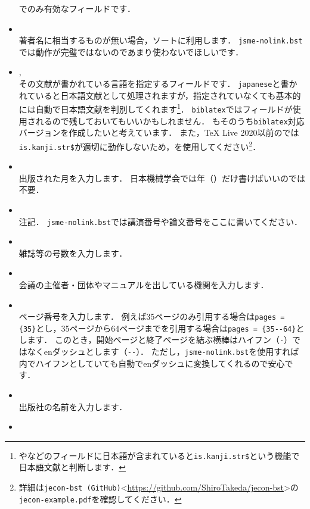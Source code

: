 \documentclass[a4paper,fleqn,uplatex,dvipdfmx]{jsarticle}
\newcommand{\jsmefile}{\texttt{jsme-nolink.bst}}
\begin{document}
\begin{itemize}
        \ttarticle でのみ有効なフィールドです．
    \item \ttkey \\
        著者名に相当するものが無い場合，ソートに利用します．
        \jsmefile では動作が完璧ではないのであまり使わないでほしいです．
    \item \ttlangid, \ttlanguage \\
        その文献が書かれている言語を指定するフィールドです．
        \verb|japanese|と書かれていると日本語文献として処理されますが，指定されていなくても基本的には自動で日本語文献を判別してくれます\footnote{\ttauthor や\tttitle などのフィールドに日本語が含まれていると\texttt{is.kanji.str\$}という機能で日本語文献と判断します．}．
        \verb|biblatex|では\ttlangid フィールドが使用されるので残しておいてもいいかもしれません．
        \JSMErepos もそのうち\verb|biblatex|対応バージョンを作成したいと考えています．
        また，TeX Live 2020以前の\upBibTeX{}では\verb|is.kanji.str$|が適切に動作しないため，\ttlangid を使用してください\footnote{詳細は\verb|jecon-bst (GitHub)|\textless \url{https://github.com/ShiroTakeda/jecon-bst}\textgreater の\verb|jecon-example.pdf|を確認してください．}．
    \item \ttmonth \\
        出版された月を入力します．
        日本機械学会では年（\ttyear）だけ書けばいいので\ttmonth は不要．
    \item \ttnote \\
        注記．
        \jsmefile では講演番号や論文番号をここに書いてください．
    \item \ttnumber \\
        雑誌等の号数を入力します．
    \item \ttorganization \\
        会議の主催者・団体やマニュアルを出している機関を入力します．
    \item \ttpages \\
        ページ番号を入力します．
        例えば35ページのみ引用する場合は\verb|pages = {35}|とし，35ページから64ページまでを引用する場合は\verb|pages = {35--64}|とします．
        このとき，開始ページと終了ページを結ぶ横棒はハイフン（\verb|-|）ではなくenダッシュとします（\verb|--|）．
        ただし，\jsmefile を使用すれば\ttpages 内でハイフンとしていても自動でenダッシュに変換してくれるので安心です．
    \item \ttpublisher \\
        出版社の名前を入力します．
    \item \ttschool \\

\end{itemize}
\end{document}
